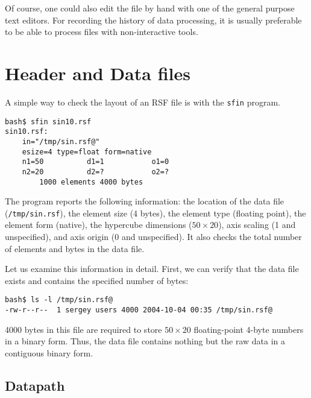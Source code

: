 Of course, one could also edit the file by hand with one of the general
purpose text editors. For recording the history of data processing, it is
usually preferable to be able to process files with non-interactive tools.

\section{Header and Data files}

A simple way to check the layout of an RSF file is with the \texttt{sfin}
program.
\begin{verbatim}
bash$ sfin sin10.rsf
sin10.rsf:
    in="/tmp/sin.rsf@"
    esize=4 type=float form=native
    n1=50          d1=1           o1=0
    n2=20          d2=?           o2=?
        1000 elements 4000 bytes
\end{verbatim}
The program reports the following information: the location of the data file
(\texttt{/tmp/sin.rsf\@}), the element size (4 bytes), the element
type (floating point), the element form (native), the hypercube dimensions
($50 \times 20$), axis scaling (1 and unspecified), and axis origin (0 and
unspecified). It also checks the total number of elements and bytes in the
data file.

Let us examine this information in detail. First, we can verify that the data
file exists and contains the specified number of bytes:
\begin{verbatim}
bash$ ls -l /tmp/sin.rsf@
-rw-r--r--  1 sergey users 4000 2004-10-04 00:35 /tmp/sin.rsf@
\end{verbatim}
4000 bytes in this file are required to store $50 \times 20$ floating-point
4-byte numbers in a binary form. Thus, the data file contains nothing but the
raw data in a contiguous binary form.

\subsection{Datapath}

